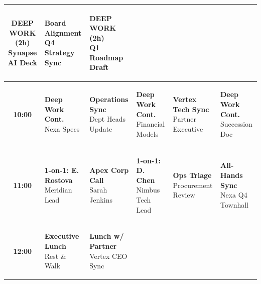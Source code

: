 \documentclass[10pt, landscape]{article}
\begin{document}
\begin{minipage}[t]{0.72\linewidth}
\begin{tabularx}{\linewidth}{|c|>{\raggedright\arraybackslash}X|>{\raggedright\arraybackslash}X|>{\raggedright\arraybackslash}X|>{\raggedright\arraybackslash}X|>{\raggedright\arraybackslash}X|}
    \colorbox{DeepWorkBg}{\parbox[t]{0.92\linewidth}{\tiny\color{DeepWorkTxt}\textbf{DEEP WORK (2h)}\\Synapse AI Deck}} &
    \colorbox{MeetingBg}{\parbox[t]{0.92\linewidth}{\tiny\color{MeetingTxt}\textbf{Board Alignment}\\Q4 Strategy Sync}} &
    \colorbox{DeepWorkBg}{\parbox[t]{0.92\linewidth}{\tiny\color{DeepWorkTxt}\textbf{DEEP WORK (2h)}\\Q1 Roadmap Draft}} \\
    \hline
    \textbf{10:00} &
    \colorbox{DeepWorkBg}{\parbox[t]{0.92\linewidth}{\tiny\color{DeepWorkTxt}\textbf{Deep Work Cont.}\\Nexa Specs}} &
    \colorbox{MeetingBg}{\parbox[t]{0.92\linewidth}{\tiny\color{MeetingTxt}\textbf{Operations Sync}\\Dept Heads Update}} &
    \colorbox{DeepWorkBg}{\parbox[t]{0.92\linewidth}{\tiny\color{DeepWorkTxt}\textbf{Deep Work Cont.}\\Financial Models}} &
    \colorbox{ClientBg}{\parbox[t]{0.92\linewidth}{\tiny\color{ClientTxt}\textbf{Vertex Tech Sync}\\Partner Executive}} &
    \colorbox{DeepWorkBg}{\parbox[t]{0.92\linewidth}{\tiny\color{DeepWorkTxt}\textbf{Deep Work Cont.}\\Succession Doc}} \\
    \hline
    \textbf{11:00} &
    \colorbox{MeetingBg}{\parbox[t]{0.92\linewidth}{\tiny\color{MeetingTxt}\textbf{1-on-1: E. Rostova}\\Meridian Lead}} &
    \colorbox{ClientBg}{\parbox[t]{0.92\linewidth}{\tiny\color{ClientTxt}\textbf{Apex Corp Call}\\Sarah Jenkins}} &
    \colorbox{MeetingBg}{\parbox[t]{0.92\linewidth}{\tiny\color{MeetingTxt}\textbf{1-on-1: D. Chen}\\Nimbus Tech Lead}} &
    \colorbox{AdminBg}{\parbox[t]{0.92\linewidth}{\tiny\color{AdminTxt}\textbf{Ops Triage}\\Procurement Review}} &
    \colorbox{MeetingBg}{\parbox[t]{0.92\linewidth}{\tiny\color{MeetingTxt}\textbf{All-Hands Sync}\\Nexa Q4 Townhall}} \\
    \hline
    \textbf{12:00} &
    \colorbox{PersonalBg}{\parbox[t]{0.92\linewidth}{\tiny\color{PersonalTxt}\textbf{Executive Lunch}\\Rest \& Walk}} &
    \colorbox{PersonalBg}{\parbox[t]{0.92\linewidth}{\tiny\color{PersonalTxt}\textbf{Lunch w/ Partner}\\Vertex CEO Sync}} &

\end{tabularx}
\end{minipage}
\end{document}
